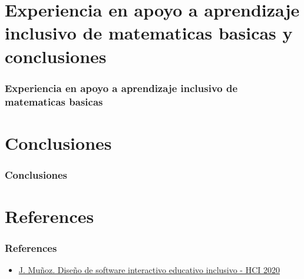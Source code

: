 \documentclass[11pt]{beamer}
\begin{document}
\section{Experiencia en apoyo a aprendizaje inclusivo de matematicas basicas y conclusiones}
\begin{frame}
\frametitle{Experiencia en apoyo a aprendizaje inclusivo de matematicas basicas}
\end{frame}

\section{Conclusiones}
\begin{frame}
\frametitle{Conclusiones}
\end{frame}

\section{References}
\begin{frame}
\frametitle{References}
\begin{itemize}
\item \href{https://www.youtube.com/watch?v=F0nOl4GRfC4&t=1577s}{J. Muñoz. Diseño de software interactivo educativo inclusivo - HCI 2020}
\end{itemize}
\end{frame}
\end{document}
